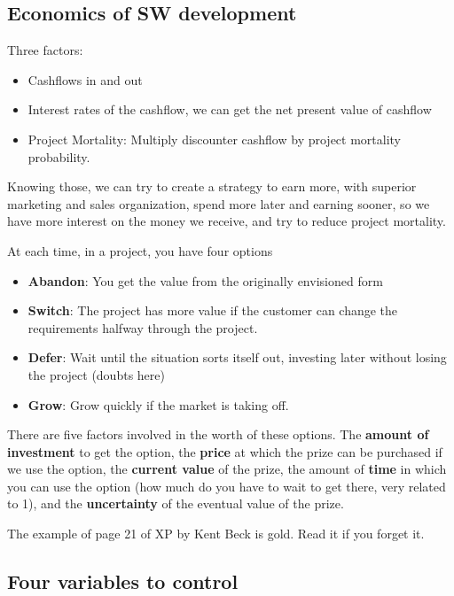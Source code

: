 \documentclass[a4paper,12pt]{article}
\begin{document}
\subsection{Economics of SW development}
Three factors:

\begin{itemize}
\item Cashflows in and out
\item Interest rates of the cashflow, we can get the net present value of cashflow
  \item Project Mortality: Multiply discounter cashflow by project mortality probability.
\end{itemize}

Knowing those, we can try to create a strategy to earn more, with superior marketing and sales organization, spend more later and earning sooner, so we have more interest on the money we receive, and try to reduce project mortality.

At each time, in a project, you have four options

\begin{itemize}
\item \textbf{Abandon}: You get the value from the originally envisioned form
\item \textbf{Switch}: The project has more value if the customer can change the requirements halfway through the project.
\item \textbf{Defer}: Wait until the situation sorts itself out, investing later without losing the project (doubts here)
\item \textbf{Grow}: Grow quickly if the market is taking off.
\end{itemize}

There are five factors involved in the worth of these options. The \textbf{amount of investment} to get the option, the \textbf{price} at which the prize can be purchased if we use the option, the \textbf{current value} of the prize, the amount of \textbf{time} in which you can use the option (how much do you have to wait to get there, very related to 1), and the \textbf{uncertainty} of the eventual value of the prize.

The example of page 21 of XP by Kent Beck is gold. Read it if you forget it.

\subsection{ Four variables to control}
\end{document}
